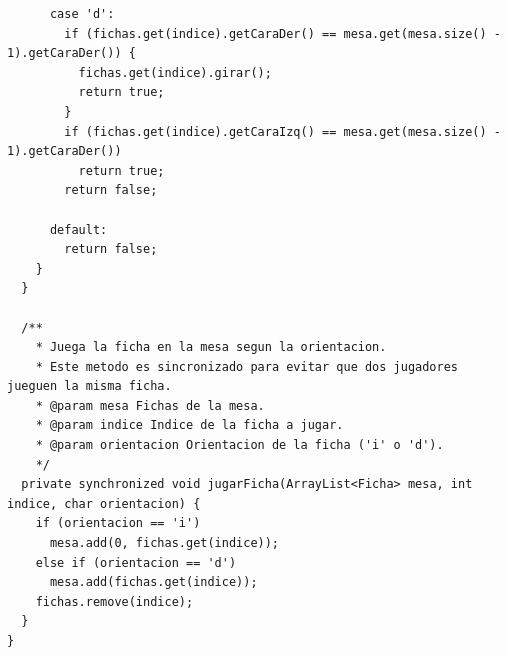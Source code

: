 \documentclass[12pt]{article}
\begin{document}
\begin{lstlisting}
      case 'd':
        if (fichas.get(indice).getCaraDer() == mesa.get(mesa.size() - 1).getCaraDer()) {
          fichas.get(indice).girar();
          return true;
        }
        if (fichas.get(indice).getCaraIzq() == mesa.get(mesa.size() - 1).getCaraDer()) 
          return true;
        return false;

      default:
        return false;   
    }
  }

  /**
    * Juega la ficha en la mesa segun la orientacion.
    * Este metodo es sincronizado para evitar que dos jugadores jueguen la misma ficha.
    * @param mesa Fichas de la mesa.
    * @param indice Indice de la ficha a jugar.
    * @param orientacion Orientacion de la ficha ('i' o 'd').
    */
  private synchronized void jugarFicha(ArrayList<Ficha> mesa, int indice, char orientacion) {
    if (orientacion == 'i')
      mesa.add(0, fichas.get(indice));
    else if (orientacion == 'd')
      mesa.add(fichas.get(indice));
    fichas.remove(indice);
  }
}
  \end{lstlisting} 
\end{document}

